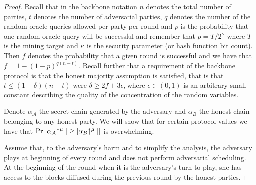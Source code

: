 \begin{proof}
Recall that in the backbone notation $n$ denotes the total number of parties,
$t$ denotes the number of adversarial parties, $q$ denotes the number of the
random oracle queries allowed per party per round and $p$ is the probability that
one random oracle query will be successful and remember that $p = T / 2^\kappa$
where $T$ is the mining target and $\kappa$ is the security parameter (or hash
function bit count). Then $f$ denotes the probability that a given round is
successful and we have that $f = 1 - (1 - p)^{q(n-t)}$. Recall further that a
requirement of the backbone protocol is that the honest majority assumption is
satisfied, that is that $t \leq (1 - \delta)(n - t)$ were $\delta \geq 2f +
3\epsilon$, where $\epsilon \in (0, 1)$ is an arbitrary small constant describing
the quality of the concentration of the random variables.

Denote $\alpha_\mathcal{A}$ the secret chain generated by the adversary and
$\alpha_B$ the honest chain belonging to any honest party. We will show that
for certain protocol values we have that
$\Pr[|\alpha_\mathcal{A}\negthickspace\uparrow^\mu| \geq |\alpha_B\negthickspace\uparrow^\mu|]$ is
overwhelming.

Assume that, to the adversary's harm and to simplify the analysis, the adversary
plays at beginning of every round and does not perform adversarial scheduling.
At the beginning of the round when it is the adversary's turn to play, she has
access to the blocks diffused during the previous round by the honest parties.


\end{proof}
